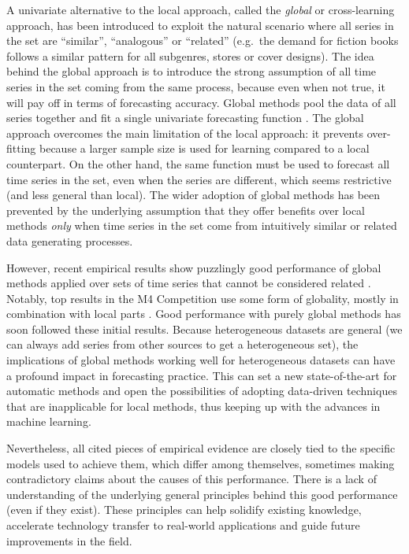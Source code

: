 \documentclass[a4paper]{article}
\theoremstyle{custom}
\begin{document}
A univariate alternative to the local approach, called the \textit{global} \cite{salinas2019DeepAR} or cross-learning \cite{smyl2020hybrid} approach, has been introduced to exploit the natural scenario where all series in the set are ``similar'', ``analogous'' or ``related'' (e.g.\ the demand for fiction books follows a similar pattern for all subgenres, stores or cover designs).
The idea behind the global approach is to introduce the strong assumption of all time series in the set coming from the same process, because even when not true, it will pay off in terms of forecasting accuracy.
Global methods pool the data of all series together and fit a single univariate forecasting function \cite{rabanser2020effectiveness}.
The global approach overcomes the main limitation of the local approach: it prevents over-fitting because a larger sample size is used for learning compared to a local counterpart.
On the other hand, the same function must be used to forecast all time series in the set, even when the series are different, which seems restrictive (and less general than local).
The wider adoption of global methods has been prevented by the underlying assumption that they offer benefits over local methods \textit{only} when time series in the set come from intuitively similar or related data generating processes.

However, recent empirical results show puzzlingly good performance of global methods applied over sets of time series that cannot be considered related \cite{laptev2017extreme}.
Notably, top results in the M4 Competition \cite{makridakis2020m4} use some form of globality, mostly in combination with local parts \cite{smyl2020hybrid,montero2020fforma}.
Good performance with purely global methods \cite{gasthaus2019probabilistic, oreshkin2019nbeats} has soon followed these initial results.
Because heterogeneous datasets are general (we can always add series from other sources to get a heterogeneous set), the implications of global methods working well for heterogeneous datasets can have a profound impact in forecasting practice. This can set a new state-of-the-art for automatic methods and open the possibilities of adopting data-driven techniques that are inapplicable for local methods, thus keeping up with the advances in machine learning.

Nevertheless, all cited pieces of empirical evidence are closely tied to the specific models used to achieve them, which differ among themselves, sometimes making contradictory claims about the causes of this performance.
There is a lack of understanding of the underlying general principles behind this good performance (even if they exist).
These principles can help solidify existing knowledge, accelerate technology transfer to real-world applications and guide future improvements in the field.
\end{document}
